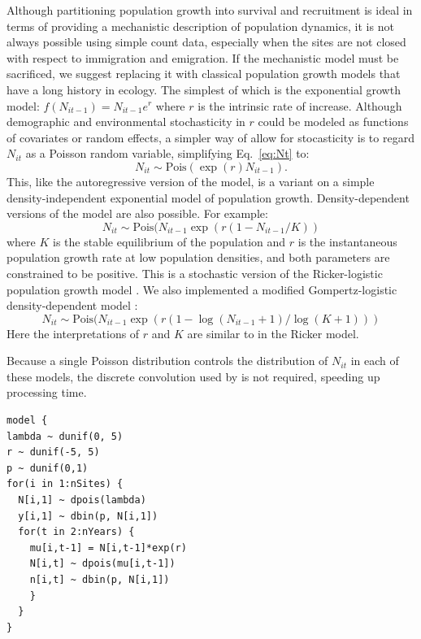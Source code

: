 \documentclass[12pt]{article}
\begin{document}
Although partitioning population growth into survival and recruitment
is ideal in terms of providing a mechanistic description of population
dynamics, it is not always possible using simple count data,
especially when the sites are not closed with respect to immigration
and emigration. %
If the mechanistic model must be sacrificed, we suggest replacing it
with classical population growth models that have a long history in
ecology. The simplest of which is the exponential growth
model: $f(N_{it-1}) = N_{it-1}e^r$ where $r$ is the intrinsic rate of
increase. Although demographic and environmental stochasticity in $r$
could be modeled as functions of covariates or random effects, a
simpler way of allow for stocasticity is
to regard $N_{it}$ as a Poisson random variable, simplifying
Eq.~\ref{eq:Nt} to:
\begin{equation}
  N_{it} \sim \text{Pois}(\exp(r)N_{it-1}).
\label{eq:exp}
\end{equation}
This,
like the autoregressive version of the model, is a variant on a simple
density-independent exponential model of population growth.
Density-dependent versions of the model are also possible.  For
example:
\begin{equation}
  N_{it} \sim \text{Pois}(N_{it-1}\exp(r(1-N_{it-1}/K))
\label{eq:rick}
\end{equation}
where $K$ is the stable equilibrium of the population and $r$ is the
instantaneous population growth rate at low population densities, and
both parameters are constrained to be positive.  This is a stochastic version
of the Ricker-logistic population growth model \citep{ricker:1954}.  We also
implemented a modified Gompertz-logistic density-dependent
model \citep{hart_gotelli:2011}:
\begin{equation}
  N_{it} \sim \text{Pois}(N_{it-1}\exp(r(1-\log(N_{it-1}+1)/\log(K+1)))
\label{eq:gomp}
\end{equation}
Here the interpretations of $r$ and $K$ are similar to in the Ricker model.

Because a single Poisson distribution controls the
distribution of $N_{it}$ in each of these models, the discrete
convolution used by \citet{dail_madsen:2011} is not required,
speeding up processing time.


\begin{verbatim}
model {
lambda ~ dunif(0, 5)
r ~ dunif(-5, 5)
p ~ dunif(0,1)
for(i in 1:nSites) {
  N[i,1] ~ dpois(lambda)
  y[i,1] ~ dbin(p, N[i,1])
  for(t in 2:nYears) {
    mu[i,t-1] = N[i,t-1]*exp(r)
    N[i,t] ~ dpois(mu[i,t-1])
    n[i,t] ~ dbin(p, N[i,1])
    }
  }
}
\end{verbatim}
\end{document}
